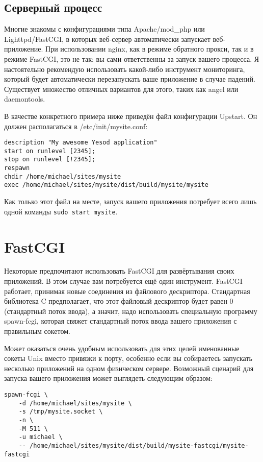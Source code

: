 \subsection{Серверный процесс}
Многие знакомы с конфигурациями типа Apache/mod\_php или Lighttpd/FastCGI, в
которых веб-сервер автоматически запускает веб-приложение. При использовании
nginx, как в режиме обратного прокси, так и в режиме FastCGI, это не так: вы
сами ответственны за запуск вашего процесса. Я настоятельно рекомендую
использовать какой-либо инструмент мониторинга, который будет автоматически
перезапускать ваше приложение в случае падений. Существует множество отличных
вариантов для этого, таких как angel или daemontools.

В качестве конкретного примера ниже приведён файл конфигурации Upstart. Он
должен располагаться в /etc/init/mysite.conf:

\begin{lstlisting}
description "My awesome Yesod application"
start on runlevel [2345];
stop on runlevel [!2345];
respawn
chdir /home/michael/sites/mysite
exec /home/michael/sites/mysite/dist/build/mysite/mysite
\end{lstlisting}

Как только этот файл на месте, запуск вашего приложения потребует всего лишь
одной команды \lstinline{sudo start mysite}.

\section{FastCGI}
Некоторые предпочитают использовать FastCGI для развёртывания своих приложений.
В этом случае вам потребуется ещё один инструмент. FastCGI работает, принимая
новые соединения из файлового дескриптора. Стандартная библиотека C
предполагает, что этот файловый дескриптор будет равен 0 (стандартный поток
ввода), а значит, надо использовать специальную программу spawn-fcgi, которая
свяжет стандартный поток ввода вашего приложения с правильным сокетом.

Может оказаться очень удобным использовать для этих целей именованные сокеты
Unix вместо привязки к порту, особенно если вы собираетесь запускать несколько
приложений на одном физическом сервере. Возможный сценарий для запуска вашего
приложения может выглядеть следующим образом:

\begin{lstlisting}
spawn-fcgi \
    -d /home/michael/sites/mysite \
    -s /tmp/mysite.socket \
    -n \
    -M 511 \
    -u michael \
    -- /home/michael/sites/mysite/dist/build/mysite-fastcgi/mysite-fastcgi
\end{lstlisting}

